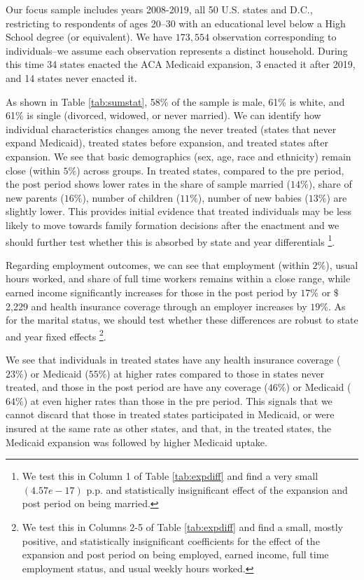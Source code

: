 \documentclass{article}
\begin{document}
Our focus sample includes years 2008-2019, all 50 U.S. states and D.C., restricting to respondents of ages 20--30 with an educational level below a High School degree (or equivalent). We have $173,554$ observation corresponding to individuals--we assume each observation represents a distinct household. During this time 34 states enacted the ACA Medicaid expansion, 3 enacted it after 2019, and 14 states never enacted it.

As shown in Table \ref{tab:sumstat}, 58\% of the sample is male, 61\% is white, and 61\% is single (divorced, widowed, or never married). We can identify how individual characteristics changes among the never treated (states that never expand Medicaid), treated states before expansion, and treated states after expansion. We see that basic demographics (sex, age, race and ethnicity) remain close (within $5\%$) across groups. In treated states, compared to the pre period, the post period shows lower rates in the share of sample married ($14\%$), share of new parents ($16\%$), number of children ($11\%$), number of new babies ($13\%$) are slightly lower. This provides initial evidence that treated individuals may be less likely to move towards family formation decisions after the enactment and we should further test whether this is absorbed by state and year differentials \footnote{We test this in Column 1 of Table \ref{tab:expdiff} and find a very small $(4.57e-17)$ p.p. and statistically insignificant effect of the expansion and post period on being married.}.

Regarding employment outcomes, we can see that employment (within $2\%$), usual hours worked, and share of full time workers remains within a close range, while earned income significantly increases for those in the post period by $17\%$ or $\$$2,229 and health insurance coverage through an employer increases by $19\%$. As for the marital status, we should test whether these differences are robust to state and year fixed effects \footnote{We test this in Columns 2-5 of Table \ref{tab:expdiff} and find a small, mostly positive, and statistically insignificant coefficients for the effect of the expansion and post period on being employed, earned income, full time employment status, and usual weekly hours worked. }.


We see that individuals in treated states have any health insurance coverage ($23\%$) or Medicaid ($55\%$) at higher rates compared to those in states never treated, and those in the post period are have any coverage ($46\%$) or Medicaid ($64\%$) at even higher rates than those in the pre period. This signals that we cannot discard that those in treated states participated in Medicaid, or were insured at the same rate as other states, and that, in the treated states, the Medicaid expansion was followed by higher Medicaid uptake. %
\end{document}
